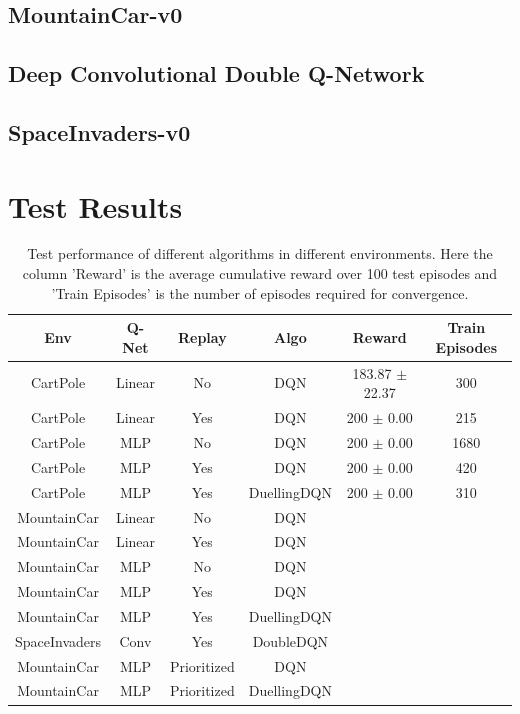 \documentclass[12pt]{article}
\begin{document}
\pagebreak[4]
\subsection*{MountainCar-v0}

\pagebreak[4]
\subsection{Deep Convolutional Double Q-Network}
\subsection*{SpaceInvaders-v0}

\pagebreak[4]
\section{Test Results}

\begin{table}[h]
\centering
\label{resulttable}
\begin{tabular}{cccccc}
\hline
Env           & Q-Net  & Replay      & Algo        & Reward    & Train Episodes \\ \hline
CartPole      & Linear & No          & DQN         & 183.87 $\pm$ 22.37 & 300      \\
CartPole      & Linear & Yes         & DQN         & 200 $\pm$ 0.00  & 215       \\
CartPole      & MLP    & No          & DQN         & 200 $\pm$ 0.00  & 1680     \\
CartPole      & MLP    & Yes         & DQN         & 200 $\pm$ 0.00  & 420      \\
CartPole      & MLP    & Yes         & DuellingDQN & 200 $\pm$ 0.00  & 310      \\
MountainCar   & Linear & No          & DQN         &           &          \\
MountainCar   & Linear & Yes         & DQN         &           &          \\
MountainCar   & MLP    & No          & DQN         &           &          \\
MountainCar   & MLP    & Yes         & DQN         &           &          \\
MountainCar   & MLP    & Yes         & DuellingDQN &           &          \\
SpaceInvaders & Conv   & Yes         & DoubleDQN   &           &          \\ \hline
MountainCar   & MLP    & Prioritized & DQN         &           &          \\
MountainCar   & MLP    & Prioritized & DuellingDQN &           &          \\ \hline
\end{tabular}
\caption{Test performance of different algorithms in different environments. Here the column 'Reward' is the average cumulative reward over 100 test episodes and 'Train Episodes' is the number of episodes required for convergence.}
\end{table}

\pagebreak[4]

\nocite{*}


\end{document}

